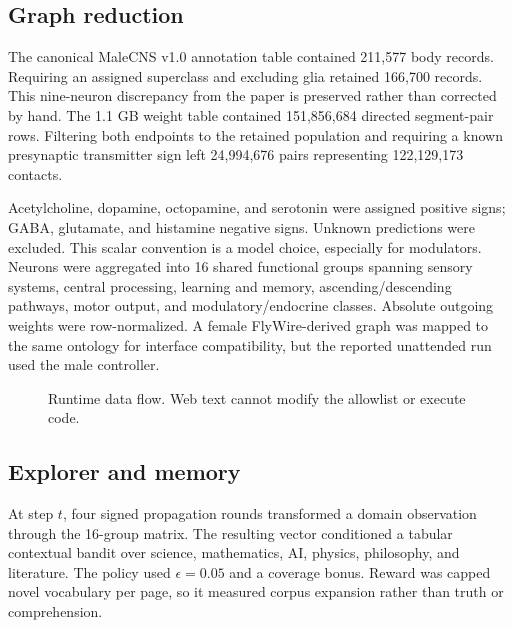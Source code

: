 \documentclass[9pt,twocolumn]{extarticle}
\begin{document}
\subsection{Graph reduction}
The canonical MaleCNS v1.0 annotation table contained 211,577 body records. Requiring an assigned superclass and excluding glia retained 166,700 records. This nine-neuron discrepancy from the paper is preserved rather than corrected by hand. The 1.1 GB weight table contained 151,856,684 directed segment-pair rows. Filtering both endpoints to the retained population and requiring a known presynaptic transmitter sign left 24,994,676 pairs representing 122,129,173 contacts.

Acetylcholine, dopamine, octopamine, and serotonin were assigned positive signs; GABA, glutamate, and histamine negative signs. Unknown predictions were excluded. This scalar convention is a model choice, especially for modulators. Neurons were aggregated into 16 shared functional groups spanning sensory systems, central processing, learning and memory, ascending/descending pathways, motor output, and modulatory/endocrine classes. Absolute outgoing weights were row-normalized. A female FlyWire-derived graph was mapped to the same ontology for interface compatibility, but the reported unattended run used the male controller.

\begin{figure}[t]
\centering
{}
\caption{Runtime data flow. Web text cannot modify the allowlist or execute code.}
\label{fig:flow}
\end{figure}

\subsection{Explorer and memory}
At step $t$, four signed propagation rounds transformed a domain observation through the 16-group matrix. The resulting vector conditioned a tabular contextual bandit over science, mathematics, AI, physics, philosophy, and literature. The policy used $\epsilon=0.05$ and a coverage bonus. Reward was capped novel vocabulary per page, so it measured corpus expansion rather than truth or comprehension.
\end{document}
